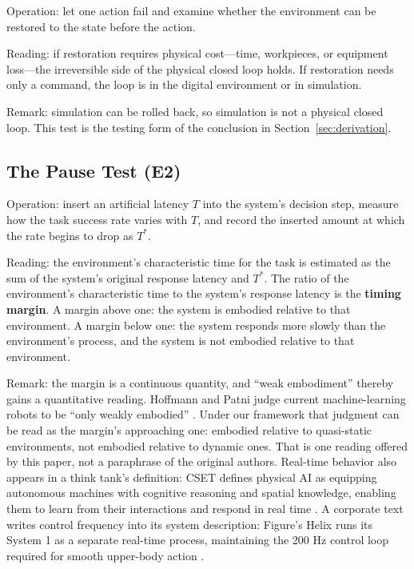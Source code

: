 \documentclass[10pt]{article}
\begin{document}
Operation: let one action fail and examine whether the environment can be restored to the state before the action.

Reading: if restoration requires physical cost---time, workpieces, or equipment loss---the irreversible side of the physical closed loop holds. If restoration needs only a command, the loop is in the digital environment or in simulation.

Remark: simulation can be rolled back, so simulation is not a physical closed loop. This test is the testing form of the conclusion in Section~\ref{sec:derivation}.

\subsection{The Pause Test (E2)}\label{sec:pause}

Operation: insert an artificial latency $T$ into the system's decision step, measure how the task success rate varies with $T$, and record the inserted amount at which the rate begins to drop as $T^{*}$.

Reading: the environment's characteristic time for the task is estimated as the sum of the system's original response latency and $T^{*}$. The ratio of the environment's characteristic time to the system's response latency is the \textbf{timing margin}. A margin above one: the system is embodied relative to that environment. A margin below one: the system responds more slowly than the environment's process, and the system is not embodied relative to that environment.

Remark: the margin is a continuous quantity, and ``weak embodiment'' thereby gains a quantitative reading. Hoffmann and Patni judge current machine-learning robots to be ``only weakly embodied'' \cite{hoffmann2025}. Under our framework that judgment can be read as the margin's approaching one: embodied relative to quasi-static environments, not embodied relative to dynamic ones. That is one reading offered by this paper, not a paraphrase of the original authors. Real-time behavior also appears in a think tank's definition: CSET defines physical AI as equipping autonomous machines with cognitive reasoning and spatial knowledge, enabling them to learn from their interactions and respond in real time \cite{cset2026}. A corporate text writes control frequency into its system description: Figure's Helix runs its System 1 as a separate real-time process, maintaining the 200 Hz control loop required for smooth upper-body action \cite{figure_helix}.
\end{document}
